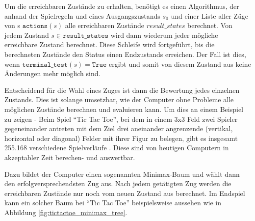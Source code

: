Um die erreichbaren Zustände zu erhalten, benötigt es einen Algorithmus, der anhand der Spielregeln und eines Ausgangszustands $s_0$ und einer Liste aller Züge von s $\mathtt{actions}(s)$ alle erreichbaren Zustände $result\_states$ berechnet. Von jedem Zustand $s \in \mathtt{result\_states}$ wird dann wiederum jeder mögliche erreichbare Zustand berechnet. Diese Schleife wird fortgeführt, bis die berechneten Zustände den Status einen Endzustands erreichen. Der Fall ist dies, wenn $\mathtt{terminal\_test}(s) = \mathtt{True}$ ergibt und somit von diesem Zustand aus keine Änderungen mehr möglich sind.

Entscheidend für die Wahl eines Zuges ist dann die Bewertung jedes einzelnen Zustands. Dies ist solange umsetzbar, wie der Computer ohne Probleme alle möglichen Zustände berechnen und evaluieren kann. Um dies an einem Beispiel zu zeigen - Beim Spiel ``Tic Tac Toe'', bei dem in einem 3x3 Feld zwei Spieler gegeneinander antreten mit dem Ziel drei aneinander angrenzende (vertikal, horizontal oder diagonal) Felder mit ihrer Figur zu belegen, gibt es insgesamt 255.168 verschiedene Spielverläufe \cite{Kaplan2017}. Diese sind von heutigen Computern in akzeptabler Zeit berechen- und auswertbar.


Dazu bildet der Computer einen sogenannten Minimax-Baum und wählt dann den erfolgversprechendsten Zug aus. Nach jedem getätigten Zug werden die erreichbaren Zustände nur noch vom neuen Zustand aus berechnet. Im Endspiel kann ein solcher Baum bei ``Tic Tac Toe'' beispielsweise aussehen wie in Abbildung \ref{fig:tictactoe_minimax_tree}.

